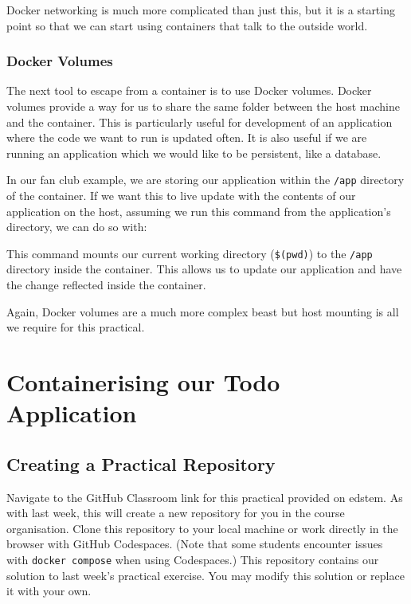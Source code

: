 \documentclass{csse4400}
\begin{document}
Docker networking is much more complicated than just this,
but it is a starting point so that we can start using containers that talk to the outside world.

\subsubsection{Docker Volumes}

The next tool to escape from a container is to use Docker volumes.
Docker volumes provide a way for us to share the same folder between the host machine and the container.
This is particularly useful for development of an application where the code we want to run is updated often.
It is also useful if we are running an application which we would like to be persistent, like a database.

In our fan club example,
we are storing our application within the \texttt{/app} directory of the container.
If we want this to live update with the contents of our application on the host,
assuming we run this command from the application's directory, we can do so with:

This command mounts our current working directory (\texttt{\$(pwd)}) to the \texttt{/app} directory inside the container.
This allows us to update our application and have the change reflected inside the container.

Again, Docker volumes are a much more complex beast but host mounting is all we require for this practical.


\section{Containerising our Todo Application}


\subsection{Creating a Practical Repository}
Navigate to the GitHub Classroom link for this practical provided on edstem.
As with last week, this will create a new repository for you in the course organisation.
Clone this repository to your local machine or work directly in the browser with GitHub Codespaces.
(Note that some students encounter issues with \texttt{docker compose} when using Codespaces.)
This repository contains our solution to last week's practical exercise.
You may modify this solution or replace it with your own.
\end{document}
